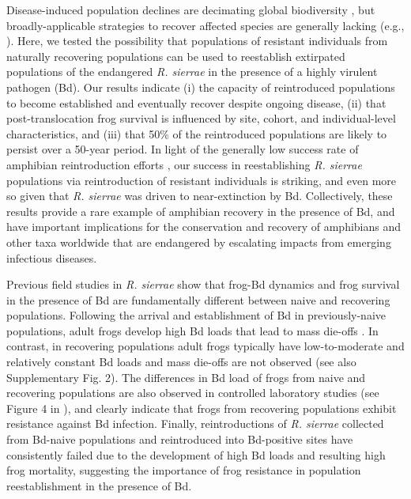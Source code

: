 \documentclass[
  letterpaper,
  DIV=11,
  numbers=noendperiod]{scrartcl}
\begin{document}
Disease-induced population declines are decimating global biodiversity
\citep{daszak2000}, but broadly-applicable strategies to recover
affected species are generally lacking (e.g., \citep{garner2016}). Here,
we tested the possibility that populations of resistant individuals from
naturally recovering populations can be used to reestablish extirpated
populations of the endangered \emph{R. sierrae} in the presence of a
highly virulent pathogen (Bd). Our results indicate (i) the capacity of
reintroduced populations to become established and eventually recover
despite ongoing disease, (ii) that post-translocation frog survival is
influenced by site, cohort, and individual-level characteristics, and
(iii) that 50\% of the reintroduced populations are likely to persist
over a 50-year period. In light of the generally low success rate of
amphibian reintroduction efforts \citep{dodd2005}, our success in
reestablishing \emph{R. sierrae} populations via reintroduction of
resistant individuals is striking, and even more so given that \emph{R.
sierrae} was driven to near-extinction by Bd. Collectively, these
results provide a rare example of amphibian recovery in the presence of
Bd, and have important implications for the conservation and recovery of
amphibians and other taxa worldwide that are endangered by escalating
impacts from emerging infectious diseases.

Previous field studies in \emph{R. sierrae} show that frog-Bd dynamics
and frog survival in the presence of Bd are fundamentally different
between naive and recovering populations. Following the arrival and
establishment of Bd in previously-naive populations, adult frogs develop
high Bd loads that lead to mass die-offs \citep{vredenburg2010}. In
contrast, in recovering populations adult frogs typically have
low-to-moderate and relatively constant Bd loads and mass die-offs are
not observed \citep{briggs2010, knapp2011} (see also Supplementary Fig.
2). The differences in Bd load of frogs from naive and recovering
populations are also observed in controlled laboratory studies (see
Figure 4 in \citep{knapp2016}), and clearly indicate that frogs from
recovering populations exhibit resistance against Bd infection. Finally,
reintroductions of \emph{R. sierrae} collected from Bd-naive populations
and reintroduced into Bd-positive sites have consistently failed due to
the development of high Bd loads and resulting high frog mortality,
suggesting the importance of frog resistance in population
reestablishment in the presence of Bd.
\end{document}
